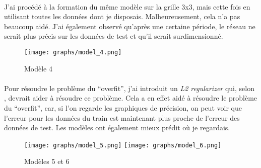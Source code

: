 \paragraph{}
J'ai procédé à la formation du même modèle sur la grille 3x3, mais cette fois en utilisant toutes les données dont je disposais.
Malheureusement, cela n'a pas beaucoup aidé.
J'ai également observé qu'après une certaine période, le réseau ne serait plus précis sur les données de test et qu'il serait surdimensionné.


\begin{figure}[H]
    \centering
    \texttt{[image: graphs/model\_4.png]}
    \caption{Modèle 4}
\end{figure}

\paragraph{}
Pour résoudre le problème du ``overfit'', j'ai introduit un \emph{L2 regularizer} qui, selon \cite{l1_l2_regularisation}, devrait aider à résoudre ce problème.
Cela a en effet aidé à résoudre le problème du ``overfit'', car, si l'on regarde les graphiques de précision, on peut voir que l'erreur pour les données du train est maintenant plus proche de l'erreur des données de test. Les modèles ont également mieux prédit où je regardais.


\begin{figure}[H]
    \centering
    \texttt{[image: graphs/model\_5.png]}
    \texttt{[image: graphs/model\_6.png]}
    \caption{Modèles 5 et 6}
\end{figure}


